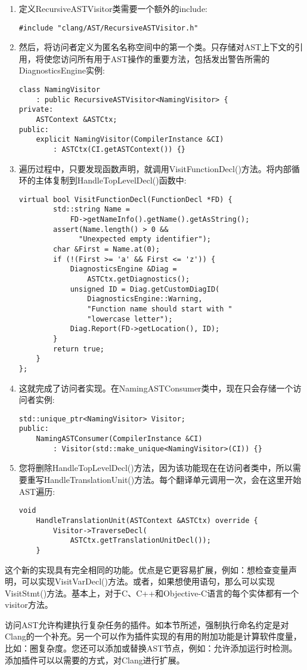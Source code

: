 \begin{enumerate}
\item 定义RecursiveASTVisitor类需要一个额外的include:
\begin{lstlisting}[caption={}]
#include "clang/AST/RecursiveASTVisitor.h"
\end{lstlisting}

\item 然后，将访问者定义为匿名名称空间中的第一个类。只存储对AST上下文的引用，将使您访问所有用于AST操作的重要方法，包括发出警告所需的DiagnosticsEngine实例:
\begin{lstlisting}[caption={}]
class NamingVisitor
	: public RecursiveASTVisitor<NamingVisitor> {
private:
	ASTContext &ASTCtx;
public:
	explicit NamingVisitor(CompilerInstance &CI)
		: ASTCtx(CI.getASTContext()) {}
\end{lstlisting}

\item 遍历过程中，只要发现函数声明，就调用VisitFunctionDecl()方法。将内部循环的主体复制到HandleTopLevelDecl()函数中:
\begin{lstlisting}[caption={}]
	virtual bool VisitFunctionDecl(FunctionDecl *FD) {
		std::string Name =
			FD->getNameInfo().getName().getAsString();
		assert(Name.length() > 0 &&
			  "Unexpected empty identifier");
		char &First = Name.at(0);
		if (!(First >= 'a' && First <= 'z')) {
			DiagnosticsEngine &Diag =
				ASTCtx.getDiagnostics();
			unsigned ID = Diag.getCustomDiagID(
				DiagnosticsEngine::Warning,
				"Function name should start with "
				"lowercase letter");
			Diag.Report(FD->getLocation(), ID);
		}
		return true;
	}
};
\end{lstlisting}

\item 这就完成了访问者实现。在NamingASTConsumer类中，现在只会存储一个访问者实例:
\begin{lstlisting}[caption={}]
	std::unique_ptr<NamingVisitor> Visitor;
public:
	NamingASTConsumer(CompilerInstance &CI)
		: Visitor(std::make_unique<NamingVisitor>(CI)) {}
\end{lstlisting}

\item 您将删除HandleTopLevelDecl()方法，因为该功能现在在访问者类中，所以需要重写Handle\allowbreak TranslationUnit()方法。每个翻译单元调用一次，会在这里开始AST遍历:
\begin{lstlisting}[caption={}]
	void
	HandleTranslationUnit(ASTContext &ASTCtx) override {
		Visitor->TraverseDecl(
			ASTCtx.getTranslationUnitDecl());
	}
\end{lstlisting}

\end{enumerate}

这个新的实现具有完全相同的功能。优点是它更容易扩展，例如：想检查变量声明，可以实现VisitVarDecl()方法。或者，如果想使用语句，那么可以实现VisitStmt()方法。基本上，对于C、C++和Objective-C语言的每个实体都有一个visitor方法。\par

访问AST允许构建执行复杂任务的插件。如本节所述，强制执行命名约定是对Clang的一个补充。另一个可以作为插件实现的有用的附加功能是计算软件度量，比如：圈复杂度。您还可以添加或替换AST节点，例如：允许添加运行时检测。添加插件可以以需要的方式，对Clang进行扩展。\par









